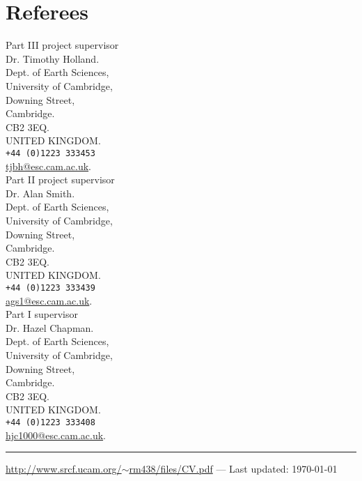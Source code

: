 \documentclass[10pt,a4paper]{article}
\begin{document}
\section*{Referees}
\small
\begin{multicols}{3}{
Part III project supervisor\\
Dr. Timothy Holland.\\
Dept. of Earth Sciences,\\
University of Cambridge,\\
Downing Street,\\
Cambridge.\\
CB2 3EQ.\\
UNITED KINGDOM.\\
\texttt{+44 (0)1223 333453}\\
\href{mailto:tjbh@esc.cam.ac.uk}{tjbh@esc.cam.ac.uk}.\\
\columnbreak
Part II project supervisor\\
Dr. Alan Smith.\\
Dept. of Earth Sciences,\\
University of Cambridge,\\
Downing Street,\\
Cambridge.\\
CB2 3EQ.\\
UNITED KINGDOM.\\
\texttt{+44 (0)1223 333439}\\
\href{mailto:ags1@esc.cam.ac.uk}{ags1@esc.cam.ac.uk}.\\
\columnbreak
Part I supervisor\\
Dr. Hazel Chapman.\\
Dept. of Earth Sciences,\\
University of Cambridge,\\
Downing Street,\\
Cambridge.\\
CB2 3EQ.\\
UNITED KINGDOM.\\
\texttt{+44 (0)1223 333408}\\
\href{mailto:hjc1000@esc.cam.ac.uk}{hjc1000@esc.cam.ac.uk}.\\
}
\end{multicols}
\normalsize

\vfill
\hrule
\begin{center}
{\footnotesize \href{http://www.srcf.ucam.org/~rm438/files/CV.pdf}{http://www.srcf.ucam.org/$\sim$rm438/files/CV.pdf} — Last updated: \today
}
\end{center}
\end{document}
